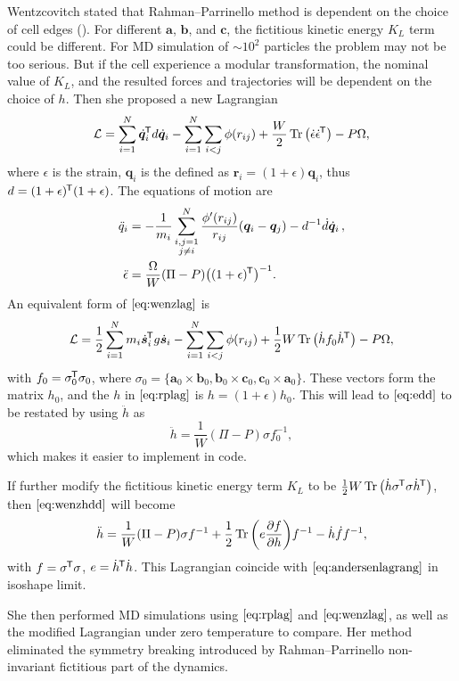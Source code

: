 Wentzcovitch stated that Rahman--Parrinello method is dependent on
the choice of cell edges (\cite{Wentzcovitch:1991ka}).
For different $\bm{a}$, $\bm{b}$, and
$\bm{c}$, the fictitious kinetic energy $K_L$ term could be different.
For MD simulation of $\sim 10^2$ particles the problem may
not be too serious. But if the cell experience a modular transformation,
the nominal value of $K_L$, and the resulted forces and trajectories
will be dependent on the choice of $h$. Then she proposed a new
Lagrangian
\begin{equation}\label{eq:wenzlag}
	\mathcal{L} = \sum_{i=1}^{N} \dot{ \bm{q} }_i^{\mkern-1.5mu\mathsf{T}} d \dot{ \bm{q} }_i
	- \sum_{i=1}^{N} \sum_{i<j} \phi(r_{ij}) + \frac{ W }{ 2 }
	\Tr \big( \dot{ \epsilon } \dot{ \epsilon }^{\mkern-1.5mu\mathsf{T}} \big) - P \Omega,
\end{equation}
where $\epsilon$ is the strain, $\bm{q}_i$ is the defined as
$\bm{r}_i = (1+\epsilon) \bm{q}_i$, thus $d = (1 + \epsilon)^{\mkern-1.5mu\mathsf{T}}
	(1+\epsilon)$.
The equations of motion are
\begin{align}
	\ddot{q}_i      & = - \frac{ 1 }{ m_i } \sum_{\substack{i, j=1 \\j\neq i}}^{N}
	\frac{ \phi'(r_{ij}) }{ r_{ij} }(\bm{q}_i - \bm{q}_j) - d^{-1} \dot{ d }
	\dot{ \bm{q} }_i \thinspace,                                   \\
	\ddot{\epsilon} & = \frac{ \Omega }{ W } (\Pi - P)
	\big((1+\epsilon)^{\mkern-1.5mu\mathsf{T}}\big)^{-1}.\label{eq:edd}
\end{align}
An equivalent form of $\eqref{eq:wenzlag}$ is
\begin{equation}
	\mathcal{L} = \frac{ 1 }{ 2 } \sum_{i=1}^{N} m_i \dot{ \bm{s} }_i ^{\mkern-1.5mu\mathsf{T}}
	g \dot{ \bm{s} }_i - \sum_{i=1}^{N} \sum_{i<j} \phi (r_{ij}) +
	\frac{ 1 }{ 2 } W \Tr \big(\dot{h} f_0 \dot{h}^{\mkern-1.5mu\mathsf{T}} \big) - P \Omega,
\end{equation}
with $f_0 = \sigma_0 ^{\mkern-1.5mu\mathsf{T}} \sigma_0$, where $\sigma_0 = \{
	\bm{a}_0 \times \bm{b}_0, \bm{b}_0 \times \bm{c}_0,
	\bm{c}_0 \times \bm{a}_0 \}$. These vectors form the matrix $h_0$,
and the $h$ in $\eqref{eq:rplag}$ is $h = (1+\epsilon) h_0$.
This will lead to $\eqref{eq:edd}$ to be restated by using $\ddot{h}$
as
\begin{equation}\label{eq:wenzhdd}
	\ddot{h} = \frac{ 1 }{ W } (\Pi - P) \sigma f_0^{-1},
\end{equation}
which makes it easier to implement in code.

If further modify the fictitious kinetic energy term $K_L$ to be
$ \frac{ 1 }{ 2 } W \Tr \big( \dot{ h } \sigma^{\mkern-1.5mu\mathsf{T}} \sigma \dot{ h }^{\mkern-1.5mu\mathsf{T}} \big)$,
then $\eqref{eq:wenzhdd}$ will become
\begin{equation}\label{eq:wenzhdd2}
	\ddot{h} = \frac{ 1 }{ W } (\Pi - P) \sigma f^{-1} + \frac{ 1 }{ 2 }
	\Tr \bigg( e \frac{ \partial f }{ \partial h } \bigg) f^{-1}
	- \dot{h} \dot{ f } f^{-1},
\end{equation}
with $f = \sigma ^{\mkern-1.5mu\mathsf{T}} \sigma$, $e = \dot{ h }^{\mkern-1.5mu\mathsf{T}} \dot{ h }$. This
Lagrangian coincide with $\eqref{eq:andersenlagrang}$ in
isoshape limit.

She then performed MD simulations using $\eqref{eq:rplag}$ and
$\eqref{eq:wenzlag}$, as well as the modified Lagrangian under zero
temperature to compare. Her method eliminated the symmetry breaking
introduced by Rahman--Parrinello non-invariant fictitious part of the dynamics.
